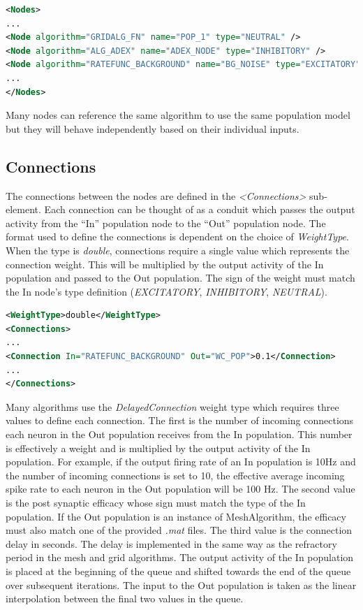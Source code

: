 \documentclass[utf8]{frontiersSCNS} %
\begin{document}
\begin{lstlisting}[language=xml,caption={Three nodes defined in the Nodes section using the types \textit{NEUTRAL}, \textit{INHIBITORY}, and \textit{EXCITATORY} respectively.}]
<Nodes>
...
<Node algorithm="GRIDALG_FN" name="POP_1" type="NEUTRAL" />
<Node algorithm="ALG_ADEX" name="ADEX_NODE" type="INHIBITORY" />
<Node algorithm="RATEFUNC_BACKGROUND" name="BG_NOISE" type="EXCITATORY" />
...
</Nodes>
\end{lstlisting}

Many nodes can reference the same algorithm to use the same population model but they will behave independently based on their individual inputs.

\subsection{Connections}

The connections between the nodes are defined in the \textit{\textless Connections\textgreater} sub-element. Each connection can be thought of as a conduit which passes the output activity from the ``In'' population node to the ``Out'' population node. The format used to define the connections is dependent on the choice of \textit{WeightType}. When the type is \textit{double}, connections require a single value which represents the connection weight. This will be multiplied by the output activity of the In population and passed to the Out population. The sign of the weight must match the In node’s type definition (\textit{EXCITATORY}, \textit{INHIBITORY}, \textit{NEUTRAL}).

\begin{lstlisting}[language=xml,caption={A simple double WeightType Connection with a single rate multiplier.}]
<WeightType>double</WeightType>
<Connections>
...
<Connection In="RATEFUNC_BACKGROUND" Out="WC_POP">0.1</Connection>
...
</Connections>
\end{lstlisting}

Many algorithms use the \textit{DelayedConnection} weight type which requires three values to define each connection. The first is the number of incoming connections each neuron in the Out population receives from the In population. This number is effectively a weight and is multiplied by the output activity of the In population. For example, if the output firing rate of an In population is 10Hz and the number of incoming connections is set to 10, the effective average incoming spike rate to each neuron in the Out population will be 100 Hz. The second value is the post synaptic efficacy whose sign must match the type of the In population. If the Out population is an instance of MeshAlgorithm, the efficacy must also match one of the provided \textit{.mat} files. The third value is the connection delay in seconds. The delay is implemented in the same way as the refractory period in the mesh and grid algorithms. The output activity of the In population is placed at the beginning of the queue and shifted towards the end of the queue over subsequent iterations. The input to the Out population is taken as the linear interpolation between the final two values in the queue. 
\end{document}
